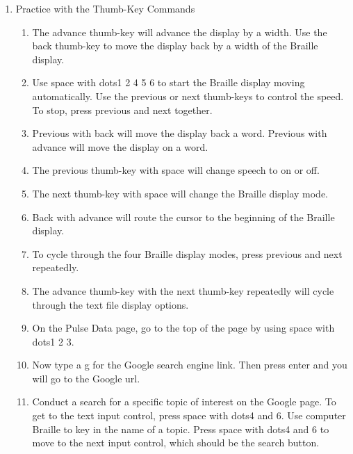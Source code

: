 \documentclass[10pt,letterpaper,twoside]{report}
\begin{document}
{{{{\begin{enumerate}
\begin{enumerate}
		      \item To query the current cursor position, use space with dots1 5 6.
	      \end{enumerate}
	\item Practice with the Thumb-Key Commands
	      
	      \begin{enumerate}
		      \item The advance thumb-key will advance the display by a width.  Use the back thumb-key to move the display back by a width of the Braille display.
		            
		      \item Use space with dots1 2 4 5 6 to start the Braille display moving automatically.  Use the previous or next thumb-keys to control the speed.  To stop, press previous and next together.
		            
		      \item Previous with back will move the display back a word.  Previous with advance will move the display on a word.
		            
		      \item The previous thumb-key with space will change speech to on or off.
		            
		      \item The next thumb-key with space will change the Braille display mode.
		            
		      \item Back with advance will route the cursor to the beginning of the Braille display.
		            
		      \item To cycle through the four Braille display modes, press previous and next repeatedly.
		            
		      \item The advance thumb-key with the next thumb-key repeatedly will cycle through the text file display options.
		            
		      \item On the Pulse Data page, go to the top of the page by using space with dots1 2 3.
		            
		      \item Now type a g for the Google search engine link.  Then press enter and you will go to the Google url.
		            
		      \item Conduct a search for a specific topic of interest on the Google page. To get to the text input control, press space with dots4 and 6.  Use computer Braille to key in the name of a topic.  Press space with dots4 and 6 to move to the next input control, which should be the search button.
		            

\end{enumerate}
\end{enumerate}}}}}
\end{document}
